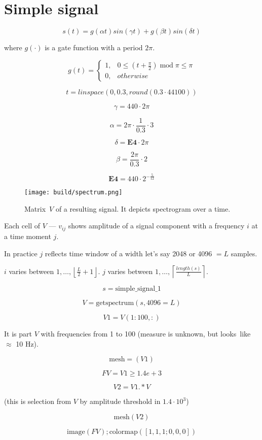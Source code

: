\documentclass{extreport}
\begin{document}
\section{Simple signal}

\[
  s(t) = g(\alpha t) sin(\gamma t) + g(\beta t) sin(\delta t)
\]

where $g(\cdot)$ is a gate function with a period $2\pi$.

\[
  g(t) =
  \begin{cases}
    1, & 0 \leqslant \left( t + \frac{\pi}{2} \right)
      \; \text{mod} \; \pi \leqslant \pi \\
    0, & otherwise
  \end{cases}
\]

$$t = linspace(0, 0.3, round(0.3 \cdot 44100))$$

$$\gamma = 440 \cdot 2 \pi$$

$$\alpha = 2 \pi \cdot \frac{1}{0.3} \cdot 3$$

$$\delta = \textbf{E4} \cdot 2 \pi$$

$$\beta = \frac{2 \pi}{0.3} \cdot 2$$

$$\textbf{E4} = 440 \cdot 2^{-\frac{5}{12}}$$

\begin{figure}
  \texttt{[image: build/spectrum.png]}
  \caption{Matrix~$V$ of a resulting signal.
  It depicts spectrogram over a time.}
\end{figure}

Each cell of $V$ --- $v_{ij}$ shows amplitude
of a signal component with a frequency $i$
at a time moment $j$.

In practice $j$ reflects time window of a width
let's say 2048 or 4096 $= L$ samples.

$i$ varies between $1, \dots, \left\lfloor \frac{L}{2}+1 \right\rfloor$.
$j$ varies between $1, \dots, \left\lceil \frac{length(s)}{L} \right\rceil$.

$$s = \text{simple\_signal\_1}$$

$$V = \text{getspectrum}(s,4096 = L)$$

$$V1 = V(1:100,:)$$

It is part $V$ with frequencies from 1 to 100 (measure is unknown,
but looks~like $\approx$ 10 Hz).

$$\text{mesh} = (V1)$$

$$FV = V1 \geqslant 1.4e+3$$

$$V2 = V1 .*  V$$

(this is selection from $V$ by amplitude threshold in $1.4 \cdot 10^3$)

$$\text{mesh}(V2)$$

$$\text{image}(FV); \text{colormap}([1, 1, 1; 0, 0, 0])$$
\end{document}
